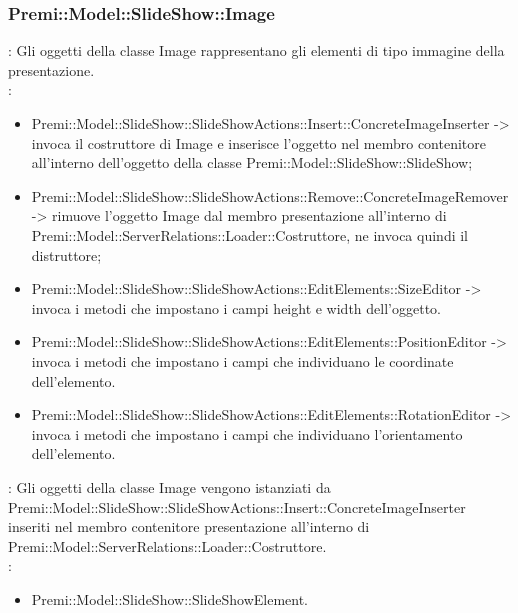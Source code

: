 {                    \subsubsection{Premi::Model::SlideShow::Image}{
				\textbf{\tipo}: Gli oggetti della classe Image rappresentano gli elementi di tipo immagine della presentazione.\\
				\textbf{\relaz}: 
				\begin{itemize}
					\item Premi::Model::SlideShow::SlideShowActions::Insert::ConcreteImageInserter -> invoca il costruttore di Image e inserisce l’oggetto nel membro contenitore all’interno dell’oggetto della classe Premi::Model::SlideShow::SlideShow;
                    \item Premi::Model::SlideShow::SlideShowActions::Remove::ConcreteImageRemover -> rimuove l’oggetto Image dal membro presentazione all’interno di Premi::Model::ServerRelations::Loader::Costruttore, ne invoca quindi il distruttore;
                    \item Premi::Model::SlideShow::SlideShowActions::EditElements::SizeEditor -> invoca i metodi che impostano i campi height e width dell'oggetto.
                    \item Premi::Model::SlideShow::SlideShowActions::EditElements::PositionEditor -> invoca i metodi che impostano i campi che individuano le coordinate dell'elemento.
                    \item Premi::Model::SlideShow::SlideShowActions::EditElements::RotationEditor -> invoca i metodi che impostano i campi che individuano l'orientamento dell'elemento.
				\end{itemize}	
                \textbf{\interfacce}: Gli oggetti della classe Image vengono istanziati da Premi::Model::SlideShow::SlideShowActions::Insert::ConcreteImageInserter  inseriti nel membro contenitore presentazione all’interno di Premi::Model::ServerRelations::Loader::Costruttore.\\
                \textbf{\base}: 
                    \begin{itemize}
                    \item Premi::Model::SlideShow::SlideShowElement.
                    \end{itemize}
                    }
}
